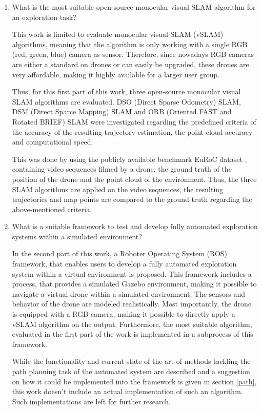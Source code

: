  \begin{enumerate}
 \item{What is the most suitable open-source monocular visual SLAM algorithm for an exploration task?}
 
 
  This work is limited to evaluate monocular visual SLAM (vSLAM) algorithms, meaning that the algorithm is only working
 with a single RGB (red, green, blue) camera as sensor. Therefore, since nowadays RGB cameras are either a standard on drones or can easily be upgraded,
 these drones are very affordable, making it highly available for a larger user group. 
 
 
 Thus, for this first part of this work, three open-source monocular visual SLAM algorithms are evaluated. 
  DSO (Direct Sparse Odometry) SLAM, DSM (Direct Sparce Mapping) SLAM and ORB (Oriented FAST and Rotated BRIEF)
 SLAM were investigated regarding the predefined criteria of the accuracy of the resulting trajectory estimation, the point cloud accuracy and computational speed. 
 
 This was done by using the publicly available benchmark EuRoC dataset \cite{euroc}, containing video sequences filmed by a drone, the 
 ground truth of the position of the drone and the point cloud of the environment. Thus, the three SLAM algorithms are applied on the 
 video sequences, the resulting trajectories and map points are compared to the ground truth regarding the above-mentioned criteria.

 \item{What is a suitable framework to test and develop fully automated exploration systems within a simulated environment?}
 
 
 In the second part of this work, a Roboter Operating System (ROS) framework, that enables users to develop a fully automated exploration system within 
 a virtual environment is proposed. This framework includes a process, that provides a simulated Gazebo environment, making it possible to navigate 
 a virtual drone within a simulated environment. The sensors and behavior of the drone are modeled realistically. Most importantly, the drone is equipped with a RGB 
 camera, making it possible to directly apply a vSLAM algorithm on the output. 
 Furthermore, the most suitable algorithm, evaluated in the first part of the work is implemented in a subprocess of this framework. 
 
 While the functionality and current state of the art of methods tackling the path planning task of the automated system are described and a suggestion on how it could 
 be implemented into the framework is given in section \ref{path}, this work doesn't include an actual implementation of such an algorithm. 
 Such implementations are left for further research. 
 

\end{enumerate}
